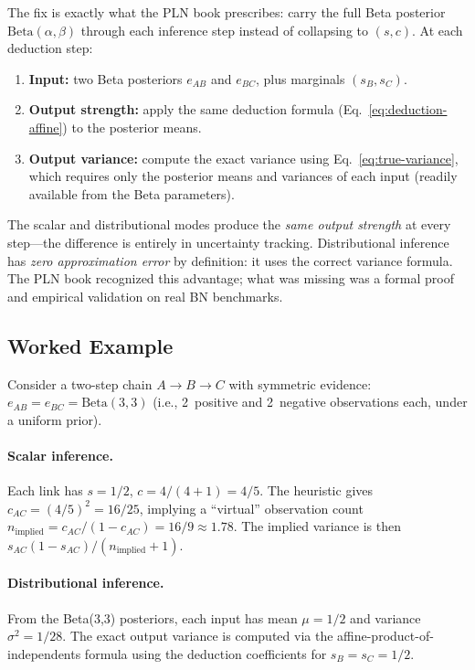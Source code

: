 \documentclass[11pt,openany]{report}
\begin{document}
The fix is exactly what the PLN book prescribes: carry the full Beta
posterior $\mathrm{Beta}(\alpha, \beta)$ through each inference step instead
of collapsing to $(s, c)$.  At each deduction step:

\begin{enumerate}
\item \textbf{Input:} two Beta posteriors $e_{AB}$ and $e_{BC}$, plus
  marginals $(s_B, s_C)$.
\item \textbf{Output strength:} apply the same deduction formula
  (Eq.~\ref{eq:deduction-affine}) to the posterior means.
\item \textbf{Output variance:} compute the exact variance using
  Eq.~\ref{eq:true-variance}, which requires only the posterior means
  and variances of each input (readily available from the Beta
  parameters).
\end{enumerate}

The scalar and distributional modes produce the \emph{same output strength}
at every step---the difference is entirely in uncertainty tracking.
Distributional inference has \emph{zero approximation error} by definition:
it uses the correct variance formula.  The PLN book recognized this
advantage; what was missing was a formal proof and empirical validation
on real BN benchmarks.

\subsection*{Worked Example}

Consider a two-step chain $A \to B \to C$ with symmetric evidence:
$e_{AB} = e_{BC} = \mathrm{Beta}(3, 3)$ (i.e., 2~positive and 2~negative
observations each, under a uniform prior).

\paragraph{Scalar inference.}  Each link has $s = 1/2$, $c = 4/(4+1) = 4/5$.
The heuristic gives $c_{AC} = (4/5)^2 = 16/25$, implying a
``virtual'' observation count $n_{\mathrm{implied}} = c_{AC}/(1 - c_{AC})
= 16/9 \approx 1.78$.  The implied variance is then
$s_{AC}(1 - s_{AC}) / (n_{\mathrm{implied}} + 1)$.

\paragraph{Distributional inference.}  From the Beta(3,3) posteriors, each input
has mean $\mu = 1/2$ and variance $\sigma^2 = 1/28$.  The exact output
variance is computed via the affine-product-of-independents formula using
the deduction coefficients for $s_B = s_C = 1/2$.
\end{document}
